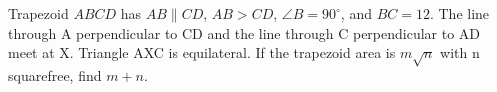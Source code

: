 Trapezoid $ABCD$ has $AB\parallel CD$, $AB>CD$, $\angle B=90^\circ$, and $BC=12$. The line through A perpendicular to CD and the line through C perpendicular to AD meet at X. Triangle AXC is equilateral. If the trapezoid area is $m\sqrt n$ with n squarefree, find $m+n$.
